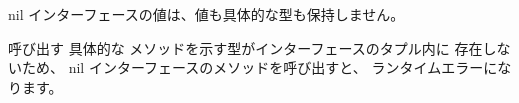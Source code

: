 nil インターフェースの値は、値も具体的な型も保持しません。

呼び出す 具体的な メソッドを示す型がインターフェースのタプル内に
存在しないため、 nil インターフェースのメソッドを呼び出すと、
ランタイムエラーになります。